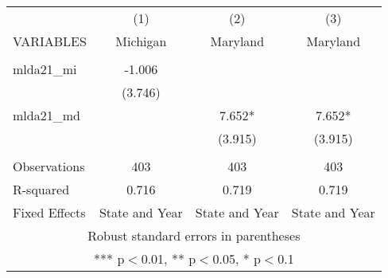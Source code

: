 \begin{tabular}{lccc} \hline
 & (1) & (2) & (3) \\
VARIABLES & Michigan & Maryland & Maryland \\ \hline
 &  &  &  \\
mlda21\_mi & -1.006 &  &  \\
 & (3.746) &  &  \\
mlda21\_md &  & 7.652* & 7.652* \\
 &  & (3.915) & (3.915) \\
 &  &  &  \\
Observations & 403 & 403 & 403 \\
R-squared & 0.716 & 0.719 & 0.719 \\
 Fixed Effects & State and Year & State and Year & State and Year \\ \hline
\multicolumn{4}{c}{ Robust standard errors in parentheses} \\
\multicolumn{4}{c}{ *** p$<$0.01, ** p$<$0.05, * p$<$0.1} \\
\end{tabular}
